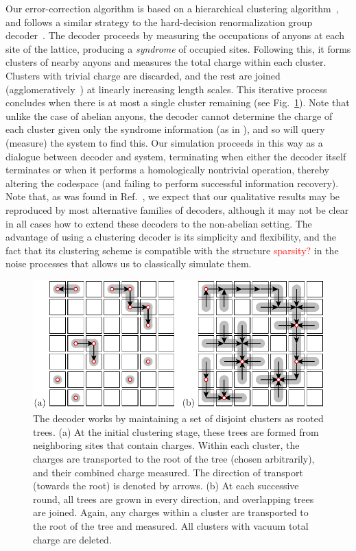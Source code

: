 \documentclass[aps, prl, letterpaper, twocolumn, superscriptaddress, notitlepage, 10pt]{revtex4-1}
\newcommand{\Fref}[1]{Fig.~\ref{#1}}
\newcommand{\dude}[1]{\textcolor{red}{#1}}
\begin{document}
Our error-correction algorithm is
based on a hierarchical clustering algorithm~\cite{Hastie2009, Wootton2015b},
and follows a similar strategy to the hard-decision renormalization group decoder~\cite{Bravyi2011}. 
The decoder proceeds by measuring the occupations of 
anyons at each site of the lattice, producing a \emph{syndrome} 
of occupied sites. Following this, it forms clusters of nearby anyons and 
measures the total charge within each cluster.
Clusters with trivial charge are discarded, and
the rest are joined (agglomeratively~\cite{Hastie2009})
at linearly increasing length scales. This iterative process concludes when 
there is at most a single cluster remaining (see \Fref{f:decode}).
Note that unlike the case of abelian anyons, the decoder
cannot determine the charge of each cluster given only the syndrome information (as in \cite{Bravyi2011}),
and so will query (measure) the system to find this.
Our simulation proceeds in this way as a dialogue between decoder
and system, terminating when either the decoder itself terminates or 
when it performs a homologically nontrivial operation, thereby altering the 
codespace (and failing to perform successful information recovery).
Note that, as was found in Ref.~\cite{Brell2013}, we expect that 
our qualitative results may be reproduced by most alternative families 
of decoders, although it may not be clear in all cases how to extend these decoders to the non-abelian setting.
The advantage of using a clustering decoder is 
its simplicity and flexibility, and the fact that its clustering 
scheme is compatible with the structure \dude{sparsity?} in the noise 
processes that allows us to classically simulate them.

\begin{figure}[t!]
\begin{center}
	\includegraphics[width=1.0\columnwidth]{pic-decode.pdf}
\caption{The decoder works by maintaining a set of disjoint clusters as rooted trees.
(a) At the initial clustering stage, these trees are formed 
from neighboring sites that contain charges. Within each cluster, the 
charges are transported to the root of the tree (chosen 
arbitrarily), and their combined charge measured. The direction of transport 
(towards the root) is denoted by arrows.
(b) At each successive round, all trees are grown in 
every direction, and overlapping trees are joined. Again, any charges 
within a cluster are transported to the root of the 
tree and measured. All clusters with vacuum total charge are deleted.
\label{f:decode}
}
\end{center}
\vspace{-10pt}
\end{figure}
\end{document}
